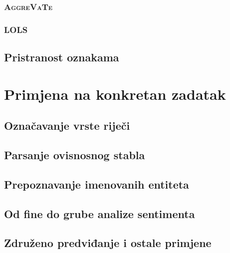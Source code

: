 \documentclass[times, utf8, diplomski]{fer}
\begin{document}
\subsection{\textsc{AggreVaTe}}\label{ch:aggrevate}


\subsection{\textsc{LOLS}}\label{ch:LOLS}


\section{Pristranost oznakama}\label{ch:labelbias}


\chapter{Primjena na konkretan zadatak}\label{ch:applications}

\section{Označavanje vrste riječi}\label{ch:postaggingapp}


\section{Parsanje ovisnosnog stabla}


\section{Prepoznavanje imenovanih entiteta}


\section{Od fine do grube analize sentimenta}


\section{Združeno predviđanje i ostale primjene}

\end{document}
